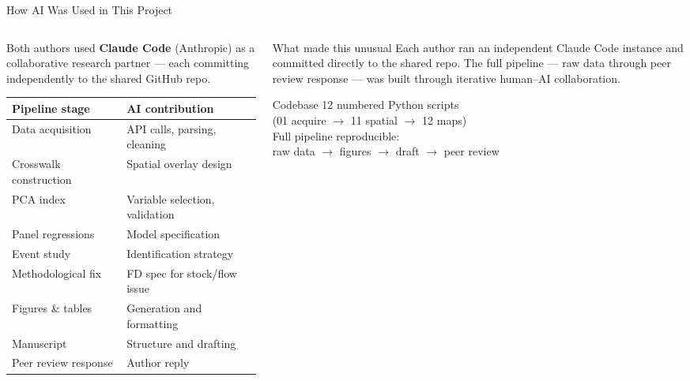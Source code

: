 \documentclass[aspectratio=169,t]{beamer}
\begin{document}
\begin{frame}{How AI Was Used in This Project}
  \begin{columns}[T]
    \begin{column}{0.55\textwidth}
      Both authors used \textbf{Claude Code} (Anthropic) as a collaborative
      research partner --- each committing independently to the shared GitHub repo.
      \vspace{0.6em}

      \small
      \begin{tabular}{ll}
        \toprule
        \textbf{Pipeline stage} & \textbf{AI contribution} \\
        \midrule
        Data acquisition     & API calls, parsing, cleaning \\
        Crosswalk construction & Spatial overlay design \\
        PCA index            & Variable selection, validation \\
        Panel regressions    & Model specification \\
        Event study          & Identification strategy \\
        Methodological fix   & FD spec for stock/flow issue \\
        Figures \& tables    & Generation and formatting \\
        Manuscript           & Structure and drafting \\
        Peer review response & Author reply \\
        \bottomrule
      \end{tabular}
    \end{column}
    \begin{column}{0.42\textwidth}
      \begin{block}{What made this unusual}
        \small Each author ran an independent Claude Code instance and committed
        directly to the shared repo. The full pipeline --- raw data through peer
        review response --- was built through iterative human--AI collaboration.
      \end{block}
      \vspace{0.4em}
      \begin{block}{Codebase}
        \small 12 numbered Python scripts\\
        (01 acquire $\to$ 11 spatial $\to$ 12 maps)\\[0.2em]
        Full pipeline reproducible:\\
        raw data $\to$ figures $\to$ draft $\to$ peer review
      \end{block}
    \end{column}
  \end{columns}
\end{frame}
\end{document}
